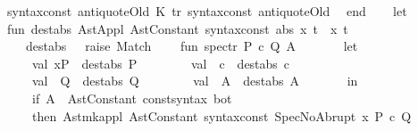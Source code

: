 \begin{isabellebody}
\ \ \ \ {\isacharparenleft}{\isacharat}{\isacharbraceleft}syntax{\isacharunderscore}const\ {\isachardoublequote}{\isacharunderscore}antiquoteOld{\isachardoublequote}{\isacharbraceright}{\isacharcomma}\ K\ {\isacharparenleft}tr\ {\isacharat}{\isacharbraceleft}syntax{\isacharunderscore}const\ {\isachardoublequote}{\isacharunderscore}antiquoteOld{}{\isachardoublequote}{\isacharbraceright}{\isacharparenright}{\isacharparenright}{\isacharbrackright}\isanewline
\ \ end\isanewline
{\isacartoucheclose}\isanewline
\isanewline
{}\isamarkupfalse%
\ {\isacartoucheopen}\isanewline
\ \ let\isanewline
\ \ \ \ fun\ dest{\isacharunderscore}abs\ {\isacharparenleft}Ast{\isachardot}Appl\ {\isacharbrackleft}Ast{\isachardot}Constant\ {\isacharat}{\isacharbraceleft}syntax{\isacharunderscore}const\ {\isachardoublequote}{\isacharunderscore}abs{\isachardoublequote}{\isacharbraceright}{\isacharcomma}\ x{\isacharcomma}\ t{\isacharbrackright}{\isacharparenright}\ {\isacharequal}\ {\isacharparenleft}x{\isacharcomma}\ t{\isacharparenright}\isanewline
\ \ \ \ \ \ {\isacharbar}\ dest{\isacharunderscore}abs\ {\isacharunderscore}\ {\isacharequal}\ raise\ Match{\isacharsemicolon}\isanewline
\ \ \ \ fun\ spec{\isacharunderscore}tr{\isacharprime}\ {\isacharbrackleft}P{\isacharcomma}\ c{\isacharcomma}\ Q{\isacharcomma}\ A{\isacharbrackright}\ {\isacharequal}\isanewline
\ \ \ \ \ \ let\ \isanewline
\ \ \ \ \ \ \ \ val\ {\isacharparenleft}x{\isacharprime}{\isacharcomma}P{\isacharprime}{\isacharparenright}\ {\isacharequal}\ dest{\isacharunderscore}abs\ P{\isacharsemicolon}\isanewline
\ \ \ \ \ \ \ \ val\ {\isacharparenleft}{\isacharunderscore}\ {\isacharcomma}c{\isacharprime}{\isacharparenright}\ {\isacharequal}\ dest{\isacharunderscore}abs\ c{\isacharsemicolon}\isanewline
\ \ \ \ \ \ \ \ val\ {\isacharparenleft}{\isacharunderscore}\ {\isacharcomma}Q{\isacharprime}{\isacharparenright}\ {\isacharequal}\ dest{\isacharunderscore}abs\ Q{\isacharsemicolon}\isanewline
\ \ \ \ \ \ \ \ val\ {\isacharparenleft}{\isacharunderscore}\ {\isacharcomma}A{\isacharprime}{\isacharparenright}\ {\isacharequal}\ dest{\isacharunderscore}abs\ A{\isacharsemicolon}\ \isanewline
\ \ \ \ \ \ in\isanewline
\ \ \ \ \ \ \ \ if\ {\isacharparenleft}A{\isacharprime}\ {\isacharequal}\ Ast{\isachardot}Constant\ {\isacharat}{\isacharbraceleft}const{\isacharunderscore}syntax\ bot{\isacharbraceright}{\isacharparenright}\isanewline
\ \ \ \ \ \ \ \ then\ Ast{\isachardot}mk{\isacharunderscore}appl\ {\isacharparenleft}Ast{\isachardot}Constant\ {\isacharat}{\isacharbraceleft}syntax{\isacharunderscore}const\ {\isachardoublequote}{\isacharunderscore}SpecNoAbrupt{\isachardoublequote}{\isacharbraceright}{\isacharparenright}\ {\isacharbrackleft}x{\isacharprime}{\isacharcomma}\ P{\isacharprime}{\isacharcomma}\ c{\isacharprime}{\isacharcomma}\ Q{\isacharprime}{\isacharbrackright}\ \isanewline

\end{isabellebody}
